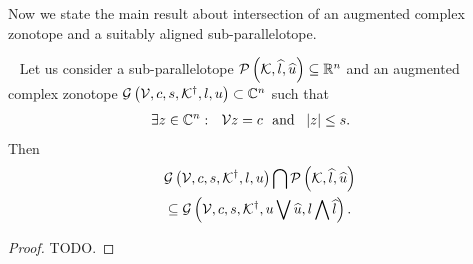 %
Now we state the main result about intersection of an augmented
complex zonotope and a suitably aligned sub-parallelotope.
%
\begin{theorem}~\label{thm:acz-ptope-intersection}
Let us consider a sub-parallelotope $\mathcal{P}\left(\mathcal{K},\widehat{l},\widehat{u}\right)\subseteq\mathbb{R}^n$ and an
augmented complex zonotope
$\mathcal{G}\left(\mathcal{V},c,s,{\mathcal{K}}^\dagger,l,u\right)\subset\mathbb{C}^n$
such that 
%
\begin{align}
& \exists z\in\mathbb{C}^n:~~\mathcal{V} z=c~~\text{and}~~\left|z\right|\leq s.~\label{eqn:contain-origin}
\end{align}
%
Then
%
\begin{align}
&
\mathcal{G}\left(\mathcal{V},c,s,{\mathcal{K}}^\dagger,l,u\right)\bigcap \mathcal{P}\left(\mathcal{K},\widehat{l},\widehat{u}\right)\nonumber\\
& \subseteq\mathcal{G}\left(\mathcal{V},c,s,{\mathcal{K}}^\dagger,u\bigvee \widehat{u},l\bigwedge \widehat{l}\right).~\label{eqn:thm:acz-ptope-intersection}
\end{align}
%
\end{theorem}
%
\begin{proof}
{\color{red} TODO}.
\end{proof}
%